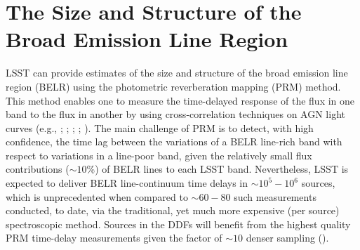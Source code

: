 %
%
%
%
%
%
%

\section{The Size and Structure of the Broad Emission Line Region}
\def\secname{\chpname:photoRM}\label{sec:\secname}




LSST can provide estimates of the size and structure of the broad
emission line region (BELR) using the photometric reverberation
mapping (PRM) method. This method enables one to measure the
time-delayed response of the flux in one band to the flux
in another by using cross-correlation techniques on AGN light
curves (e.g., \citet{Chelouche2013}; \citet{CheloucheandZucker2013};
\citet{CheloucheEtal2014}; \citet{EdelsonEtal2015};
\citet{FausnaughEtal2015}). The main challenge of PRM is to detect,
with high confidence, the time lag between the variations of a BELR
line-rich band with respect to variations in a line-poor band, given
the relatively small flux contributions ($\sim10$\%) of BELR lines to each
LSST band. Nevertheless, LSST is expected to deliver BELR line-continuum
time delays in $\sim10^5-10^6$ sources, which is unprecedented when
compared to $\sim60-80$ such measurements conducted, to date, via the
traditional, yet much more expensive (per source) spectroscopic method.
Sources in the DDFs will benefit from the highest
quality PRM time-delay measurements given the factor of $\sim10$ denser
sampling (\citet{CheloucheEtal2014}).

